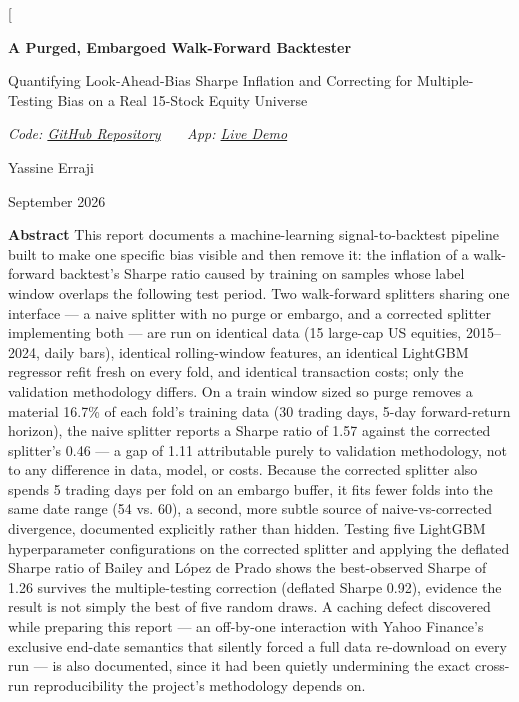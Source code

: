 \documentclass[10pt]{article}
\title{\vspace{-2em}}
\date{}
\begin{document}
\twocolumn[{
\centering
{\LARGE\bfseries A Purged, Embargoed Walk-Forward Backtester}\par
\vspace{6pt}
{\large Quantifying Look-Ahead-Bias Sharpe Inflation and Correcting for
Multiple-Testing Bias on a Real 15-Stock Equity Universe}\par
\vspace{10pt}
{\itshape Code: \href{https://github.com/yassineerraji/ML-Backtester-with-Strict-Anti-Look-Ahead-Bias}{GitHub Repository}
\ \textbar\ \ App: \href{https://ml-backtester-with-strict-anti-look-ahead-bias.streamlit.app}{Live Demo}}\par
\vspace{10pt}
Yassine Erraji\par
September 2026\par
\vspace{10pt}
}

\noindent\textbf{Abstract} This report documents a machine-learning signal-to-backtest pipeline built to make one specific bias visible and then remove it: the inflation of a walk-forward backtest's Sharpe ratio caused by training on samples whose label window overlaps the following test period. Two walk-forward splitters sharing one interface --- a naive splitter with no purge or embargo, and a corrected splitter implementing both --- are run on identical data (15 large-cap US equities, 2015--2024, daily bars), identical rolling-window features, an identical LightGBM regressor refit fresh on every fold, and identical transaction costs; only the validation methodology differs. On a train window sized so purge removes a material 16.7\% of each fold's training data (30 trading days, 5-day forward-return horizon), the naive splitter reports a Sharpe ratio of 1.57 against the corrected splitter's 0.46 --- a gap of 1.11 attributable purely to validation methodology, not to any difference in data, model, or costs. Because the corrected splitter also spends 5 trading days per fold on an embargo buffer, it fits fewer folds into the same date range (54 vs. 60), a second, more subtle source of naive-vs-corrected divergence, documented explicitly rather than hidden. Testing five LightGBM hyperparameter configurations on the corrected splitter and applying the deflated Sharpe ratio of Bailey and L\'opez de Prado shows the best-observed Sharpe of 1.26 survives the multiple-testing correction (deflated Sharpe 0.92), evidence the result is not simply the best of five random draws. A caching defect discovered while preparing this report --- an off-by-one interaction with Yahoo Finance's exclusive end-date semantics that silently forced a full data re-download on every run --- is also documented, since it had been quietly undermining the exact cross-run reproducibility the project's methodology depends on.
\end{document}
